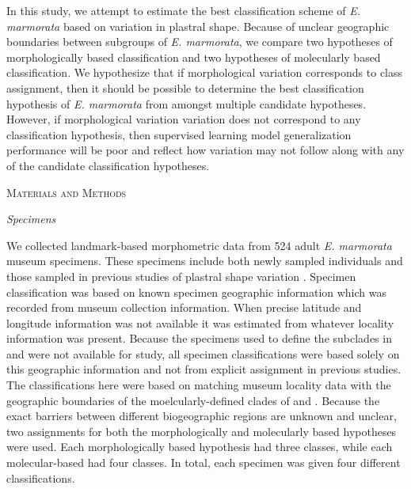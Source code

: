\documentclass[12pt,letterpaper]{article}\usepackage{graphicx, color}
\renewcommand{\section}[1]{%
\bigskip
\begin{center}
\begin{Large}
\normalfont\scshape #1
\medskip
\end{Large}
\end{center}}
\renewcommand{\subsection}[1]{%
\bigskip
\begin{center}
\begin{large}
\normalfont\itshape #1
\end{large}
\end{center}}
\begin{document}
In this study, we attempt to estimate the best classification scheme of \textit{E. marmorata} based on variation in plastral shape. Because of unclear geographic boundaries between subgroups of \textit{E. marmorata}, we compare two hypotheses of morphologically based classification and two hypotheses of molecularly based classification. We hypothesize that if morphological variation corresponds to class assignment, then it should be possible to determine the best classification hypothesis of \textit{E. marmorata} from amongst multiple candidate hypotheses. However, if morphological variation variation does not correspond to any classification hypothesis, then supervised learning model generalization performance will be poor and reflect how variation may not follow along with any of the candidate classification hypotheses.

\section{Materials and Methods}
\subsection{Specimens}
We collected landmark-based morphometric data from 524 adult \textit{E. marmorata} museum specimens. These specimens include both newly sampled individuals and those sampled in previous studies of plastral shape variation \citep{Angielczyk2007,Angielczyk2011,Angielczyk2013a}. 
Specimen classification was based on known specimen geographic information which was recorded from museum collection information. When precise latitude and longitude information was not available it was estimated from whatever locality information was present. Because the specimens used to define the subclades in \citet{Spinks2005} and \citet{Spinks2010} were not available for study, all specimen classifications were based solely on this geographic information and not from explicit assignment in previous studies. The classifications here were based on matching museum locality data with the geographic boundaries of the moelcularly-defined clades of \citet{Spinks2005} and \citet{Spinks2010}. Because the exact barriers between different biogeographic regions are unknown and unclear, two assignments for both the morphologically and molecularly based hypotheses were used. Each morphologically based hypothesis had three classes, while each molecular-based had four classes. In total, each specimen was given four different classifications. 
\end{document}
